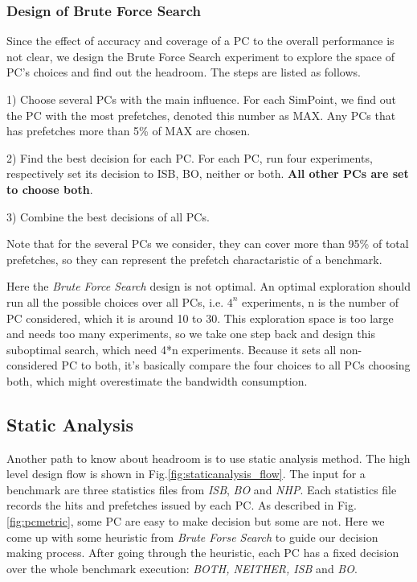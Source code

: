     \subsubsection{Design of Brute Force Search}
    \label{sec:designBFS}
    Since the effect of accuracy and coverage of a PC to the overall performance is not clear, we design the Brute Force Search experiment to explore the space of PC's choices and find out the headroom. The steps are listed as follows. \par
    1) Choose several PCs with the main influence. For each SimPoint, we find out the PC with the most prefetches, denoted this number as MAX. Any PCs that has prefetches more than 5\% of MAX are chosen.\par
    2) Find the best decision for each PC. For each PC, run four experiments, respectively set its decision to ISB, BO, neither or both. \textbf{All other PCs are set to choose both}.\par
    3) Combine the best decisions of all PCs.\par
    Note that for the several PCs we consider, they can cover more than 95\% of total prefetches, so they can represent the prefetch charactaristic of a benchmark. \par
    Here the \emph{Brute Force Search} design is not optimal. An optimal exploration should run all the possible choices over all PCs, i.e. $4^{n}$ experiments, n is the number of PC considered, which it is around 10 to 30.
    This exploration space is too large and needs too many experiments, so we take one step back and design this suboptimal search, which need 4*n experiments. Because it sets all non-considered PC to both, it's basically compare the four choices to all PCs choosing both, which might overestimate the bandwidth consumption. \par

  \subsection{Static Analysis}
  \label{sec:staticanalysis}
  Another path to know about headroom is to use static analysis method. The high level design flow is shown in Fig.\ref{fig:staticanalysis_flow}. The input for a benchmark are three statistics files from \emph{ISB}, \emph{BO} and \emph{NHP}. Each statistics file records the hits and prefetches issued by each PC. As described in Fig.\ref{fig:pcmetric}, some PC are easy to make decision but some are not. Here we come up with some heuristic from \emph{Brute Forse Search} to guide our decision making process. After going through the heuristic, each PC has a fixed decision over the whole benchmark execution: \emph{BOTH, NEITHER, ISB} and \emph{BO}.


